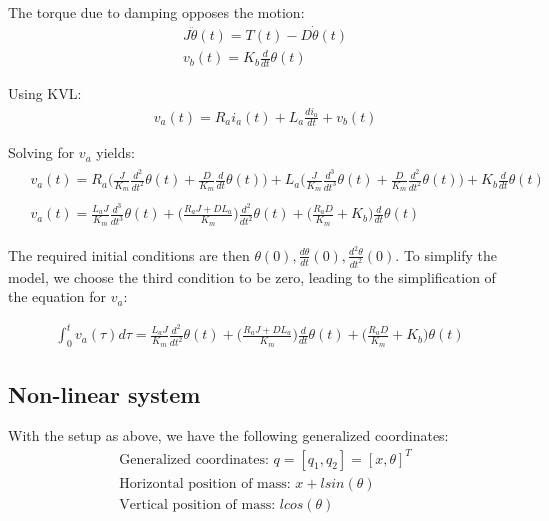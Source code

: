 \documentclass [12pt,letterpaper]{exam}
\begin{document}
The torque due to damping opposes the motion:
\begin{align}
& J\ddot{\theta}(t) = T(t) - D\dot{\theta}(t) \\
& v_b(t) = K_b\frac{d}{dt}\theta(t)
\end{align}

Using KVL:
\begin{align}
& v_a(t) = R_ai_a(t) + L_a\frac{di_a}{dt} + v_b(t)
\end{align}

Solving for $v_a$ yields:
\begin{align}
\begin{split}
& v_a(t) = R_a\bigg(\frac{J}{K_m}\frac{d^2}{dt^2}\theta(t) + \frac{D}{K_m}\frac{d}{dt}\theta(t)\bigg) + L_a\bigg(\frac{J}{K_m}\frac{d^3}{dt^3}\theta(t) + \frac{D}{K_m}\frac{d^2}{dt^2}\theta(t)\bigg) + K_b\frac{d}{dt}\theta(t) \end{split} \\
\begin{split}
& v_a(t) = \frac{L_aJ}{K_m}\frac{d^3}{dt^3}\theta(t) + \bigg(\frac{R_aJ + DL_a}{K_m}\bigg)\frac{d^2}{dt^2}\theta(t) + \bigg(\frac{R_aD}{K_m} + K_b\bigg)\frac{d}{dt}\theta(t)
\end{split}
\end{align}

The required initial conditions are then $\theta(0), \frac{d\theta}{dt}(0), \frac{d^2\theta}{dt^2}(0)$. To simplify the model, we choose the third condition to be zero, leading to the simplification of the equation for $v_a$:

\begin{align}
\int_{0}^{t} v_a(\tau) d\tau = \frac{L_aJ}{K_m}\frac{d^2}{dt^2}\theta(t) + \bigg(\frac{R_aJ + DL_a}{K_m}\bigg)\frac{d}{dt}\theta(t) + \bigg(\frac{R_aD}{K_m} + K_b\bigg)\theta(t)
\end{align}

\subsection{Non-linear system}
With the setup as above, we have the following generalized coordinates:
\begin{align}
& \mbox{Generalized coordinates: } q = [q_1, q_2] = [x, \theta]^T \\
& \mbox{Horizontal position of mass: } x + lsin(\theta) \\
& \mbox{Vertical position of mass: } lcos(\theta)
\end{align}
\end{document}
